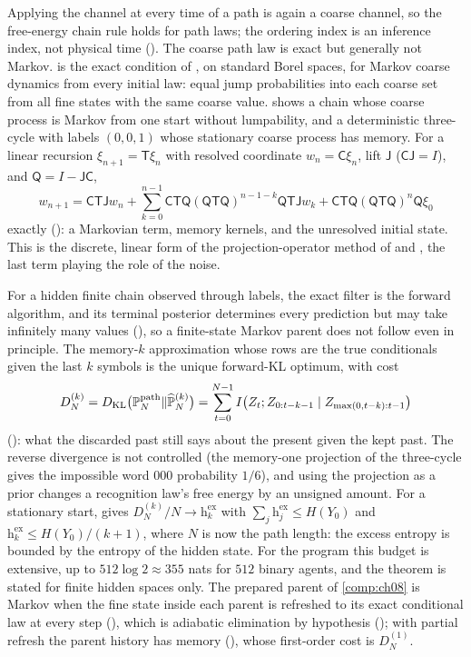 Applying the channel at every time of a path is again a coarse channel, so the free-energy chain rule
holds for path laws; the ordering index is an inference index, not physical time
(). The coarse path law is exact but generally not Markov.
 is the exact condition of \citet[Thm.~6.3.2]{KemenySnell1976}, on
standard Borel spaces, for Markov coarse dynamics from every initial law: equal jump probabilities into
each coarse set from all fine states with the same coarse value. 
shows a chain whose coarse process is Markov from one start without lumpability, and a deterministic
three-cycle with labels $(0,0,1)$ whose stationary coarse process has memory. For a linear recursion
$\xi_{n+1}=\mathsf T\xi_n$ with resolved coordinate $w_n=\mathsf C\xi_n$, lift $\mathsf J$
($\mathsf C\mathsf J=I$), and $\mathsf Q=I-\mathsf J\mathsf C$,
\[
w_{n+1}=\mathsf C\mathsf T\mathsf Jw_n
+\sum_{k=0}^{n-1}\mathsf C\mathsf T\mathsf Q(\mathsf Q\mathsf T\mathsf Q)^{n-1-k}\mathsf Q\mathsf T\mathsf Jw_k
+\mathsf C\mathsf T\mathsf Q(\mathsf Q\mathsf T\mathsf Q)^n\mathsf Q\xi_0
\]
exactly (): a Markovian term, memory kernels, and the unresolved initial
state. This is the discrete, linear form of the projection-operator method of \citet{Nakajima1958} and
\citet{Zwanzig1960}, the last term playing the role of the noise.

For a hidden finite chain observed through labels, the exact filter is the forward algorithm, and its
terminal posterior determines every prediction but may take infinitely many values
(), so a finite-state Markov parent does not follow even in principle. The
memory-$k$ approximation whose rows are the true conditionals given the last $k$ symbols is the unique
forward-KL optimum, with cost
\[
D^{(k)}_N=D_{\mathrm{KL}}\bigl(\mathbb P^{\mathrm{path}}_N\Vert\widehat{\mathbb P}^{(k)}_N\bigr)
=\sum_{t=0}^{N-1}I\bigl(Z_t;Z_{0:t-k-1}\mid Z_{\max(0,t-k):t-1}\bigr)
\]
(): what the discarded past still says about the present given the kept
past. The reverse divergence is not controlled (the memory-one projection of the three-cycle gives the
impossible word $000$ probability $1/6$), and using the projection as a prior changes a recognition
law's free energy by an unsigned amount. For a stationary start,
 gives $D^{(k)}_N/N\to\mathrm h^{\mathrm{ex}}_k$ with
$\sum_j\mathrm h^{\mathrm{ex}}_j\le H(Y_0)$ and $\mathrm h^{\mathrm{ex}}_k\le H(Y_0)/(k+1)$, where $N$ is
now the path length: the excess entropy \citep{CrutchfieldFeldman2003} is bounded by the entropy of the
hidden state. For the program this budget is extensive, up to $512\log2\approx355$ nats for $512$
binary agents, and the theorem is stated for finite hidden spaces only. The prepared parent of
\cref{comp:ch08} is Markov when the fine state inside each parent is refreshed to its exact conditional
law at every step (), which is adiabatic elimination by hypothesis
(); with partial refresh the parent history has memory
(), whose first-order cost is $D^{(1)}_N$.


